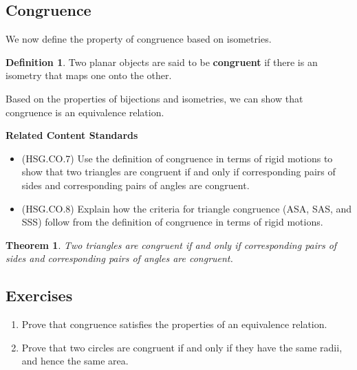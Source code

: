 \documentclass[
]{book}
\providecommand{\tightlist}{%
  \setlength{\itemsep}{0pt}\setlength{\parskip}{0pt}}
\newenvironment{standards}{}{}
\newtheorem{theorem}{Theorem}[chapter]
\theoremstyle{definition}
\newtheorem{definition}{Definition}[chapter]
\theoremstyle{definition}
\theoremstyle{definition}
\theoremstyle{definition}
\theoremstyle{remark}
\begin{document}
\hypertarget{congruence}{%
\subsection{Congruence}\label{congruence}}

We now define the property of congruence based on isometries.

\begin{definition}
Two planar objects are said to be \textbf{congruent} if there is an isometry that maps one onto the other.
\end{definition}

Based on the properties of bijections and isometries, we can show that congruence is an equivalence relation.

\begin{standards}

\begin{center}
\textbf{Related Content Standards}

\end{center}

\begin{itemize}
\tightlist
\item
  (HSG.CO.7) Use the definition of congruence in terms of rigid motions to show that two triangles are congruent if and only if corresponding pairs of sides and corresponding pairs of angles are congruent.\\
\item
  (HSG.CO.8) Explain how the criteria for triangle congruence (ASA, SAS, and SSS) follow from the definition of congruence in terms of rigid motions.
\end{itemize}

\end{standards}

\begin{theorem}
Two triangles are congruent if and only if corresponding pairs of sides and corresponding pairs of angles are congruent.
\end{theorem}

\hypertarget{exercises-50}{%
\subsection{Exercises}\label{exercises-50}}

\begin{enumerate}
\def\labelenumi{\arabic{enumi}.}
\item
  Prove that congruence satisfies the properties of an equivalence relation.
\item
  Prove that two circles are congruent if and only if they have the same radii, and hence the same area.
\end{enumerate}
\end{document}
